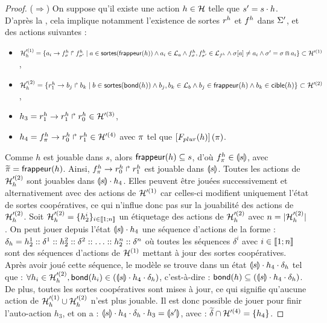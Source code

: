 \begin{proof}
  ($\Rightarrow$) On suppose qu'il existe une action $h \in \mathcal{H}$ telle que $s' = s \cdot h$.
    D'après la ,
    cela implique notamment l'existence de sortes $r^{h}$ et $f^{h}$ dans $\Sigma'$,
    et des actions suivantes :
    \begin{itemize}
      \item $\mathcal{H}'^{(1)}_h = \{ a_i\rightarrow f^{h}_\sigma\Rsh f^{h}_{\sigma'} \mid
        a \in \mathsf{sortes}(\mathsf{frappeur}(h)) \wedge a_i \in \mathcal{L}_a \wedge
        f^{h}_\sigma , f^{h}_{\sigma'} \in \mathcal{L}_{f^{h}} \wedge
        {\sigma[a]} \neq a_i \wedge \sigma' = \sigma \Cap a_i \} \subset \mathcal{H}'^{(1)}$,
      \item $\mathcal{H}'^{(2)}_h = \{ r^{h}_1\rightarrow b_j\Rsh b_k \mid
        b \in \mathsf{sortes}(\mathsf{bond}(h)) \wedge b_j, b_k \in \mathcal{L}_b \wedge
        b_j \in \mathsf{frappeur}(h) \wedge b_k \in \mathsf{cible}(h) \} \subset \mathcal{H}'^{(2)}$,
      \item $h_3 = r^{h}_1\rightarrow r^{h}_1\Rsh r^{h}_0 \in \mathcal{H}'^{(3)}$,
      \item $h_4 = f^{h}_\pi\rightarrow r^{h}_0\Rsh r^{h}_1 \in \mathcal{H}'^{(4)}$ avec $\pi$ tel que
        $\left[F_{plur}(h)\right](\pi)$.
    \end{itemize}
    Comme $h$ est jouable dans $s$, alors $\mathsf{frappeur}(h) \subseteq s$,
    d'où $f^{h}_{\pi} \in \llparenthesis s \rrparenthesis$, avec $\widetilde{\pi} = \mathsf{frappeur}(h)$.
    Ainsi, $f^{h}_\pi\rightarrow r^{h}_0\Rsh r^{h}_1$ est jouable dans $\llparenthesis s \rrparenthesis$.
    Toutes les actions de $\mathcal{H}'^{(2)}_h$ sont jouables dans $\llparenthesis s \rrparenthesis \cdot h_4$.
    Elles peuvent être jouées successivement et alternativement avec des actions de
    $\mathcal{H}'^{(1)}$ car celles-ci modifient uniquement l'état de sortes coopératives,
    ce qui n'influe donc pas sur la jouabilité des actions de $\mathcal{H}'^{(2)}_h$.
    Soit $\mathcal{H}'^{(2)}_h = \{ h_2^i \}_{i \in \mathopen{\llbracket}1\mathclose{};n\mathclose{\rrbracket}}$
    un étiquetage des actions de $\mathcal{H}'^{(2)}_h$
    avec $n = |\mathcal{H}'^{(2)}_h|$.
    On peut jouer depuis l'état $\llparenthesis s \rrparenthesis \cdot h_4$ une séquence d'actions de la forme :
    $\delta_h =
      h_2^1 :: \delta^1 :: h_2^2 :: \delta^2 ::
      \ldots ::
      h_2^n :: \delta^n$
    où toutes les séquences $\delta^i$ avec $i \in \mathopen{\llbracket}1\mathclose{};n\mathclose{\rrbracket}$
    sont des séquences d'actions de $\mathcal{H}^{(1)}$ mettant à jour des sortes coopératives.
    Après avoir joué cette séquence, le modèle se trouve dans un état
    $\llparenthesis s \rrparenthesis \cdot h_4 \cdot \delta_h$ tel que :
    $\forall h_i \in \mathcal{H}'^{(2)}_h, \mathsf{bond}(h_i) \in (\llparenthesis s \rrparenthesis \cdot h_4 \cdot \delta_h)$,
    c'est-à-dire : $\mathsf{bond}(h) \subseteq (\llparenthesis s \rrparenthesis \cdot h_4 \cdot \delta_h)$.
    De plus, toutes les sortes coopératives sont mises à jour, ce qui signifie qu'aucune
    action de $\mathcal{H}'^{(1)}_h \cup \mathcal{H}'^{(2)}_h$ n'est plus jouable.
    Il est donc possible de jouer pour finir l'auto-action $h_3$,
    et on a :
    $\llparenthesis s \rrparenthesis \cdot h_4 \cdot \delta_h \cdot h_3 = \llparenthesis s' \rrparenthesis$,
    avec : $\widetilde{\delta} \cap \mathcal{H}'^{(4)} = \{ h_4 \}$.
  

\end{proof}

